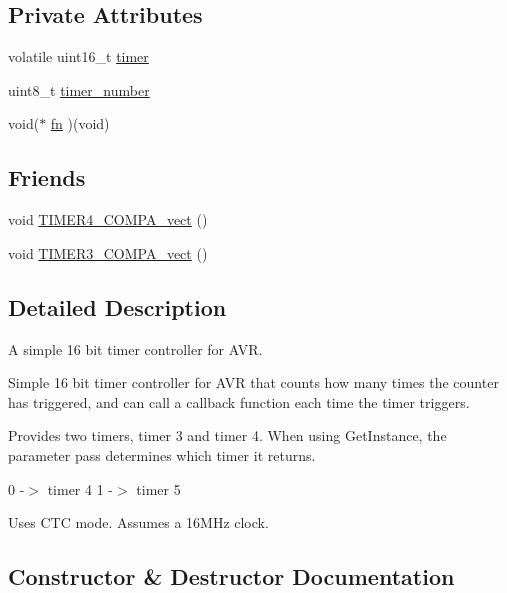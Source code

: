 \subsection*{Private Attributes}
\begin{DoxyCompactItemize}
\item 
volatile uint16\+\_\+t \hyperlink{class_timer_abd1196c7069c046e192e936bfc264693}{timer}
\item 
uint8\+\_\+t \hyperlink{class_timer_a3c813be60ee224a8d6b252a83dfe16d3}{timer\+\_\+number}
\item 
void($\ast$ \hyperlink{class_timer_af44fd5c977c119c25af6aeee6f7cdc7a}{fn} )(void)
\end{DoxyCompactItemize}
\subsection*{Friends}
\begin{DoxyCompactItemize}
\item 
void \hyperlink{class_timer_a53c4be4b5bb54690ef9012fde8d97b9c}{T\+I\+M\+E\+R4\+\_\+\+C\+O\+M\+P\+A\+\_\+vect} ()
\item 
void \hyperlink{class_timer_a7aadba5fdadb4c3e5483845e75cdf5a1}{T\+I\+M\+E\+R3\+\_\+\+C\+O\+M\+P\+A\+\_\+vect} ()
\end{DoxyCompactItemize}


\subsection{Detailed Description}
A simple 16 bit timer controller for A\+VR. 

Simple 16 bit timer controller for A\+VR that counts how many times the counter has triggered, and can call a callback function each time the timer triggers.

Provides two timers, timer 3 and timer 4. When using Get\+Instance, the parameter pass determines which timer it returns.

0 -\/$>$ timer 4 1 -\/$>$ timer 5

Uses C\+TC mode. Assumes a 16\+M\+Hz clock. 

\subsection{Constructor \& Destructor Documentation}
\hypertarget{class_timer_a609e586dbc0fdc159fc6fd490fcc1ae3}{}\label{class_timer_a609e586dbc0fdc159fc6fd490fcc1ae3} 
